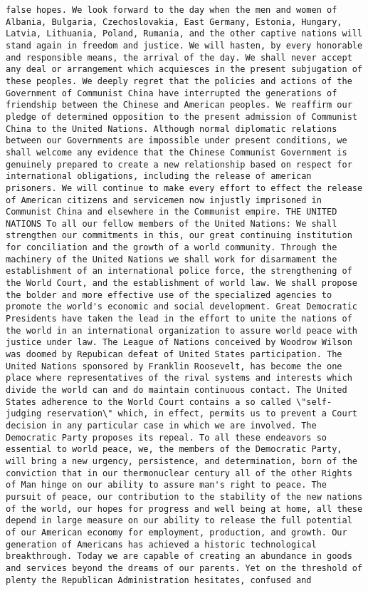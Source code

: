 \documentclass[
]{article}
\begin{document}
\begin{verbatim}
false hopes. We look forward to the day when the men and women of Albania, Bulgaria, Czechoslovakia, East Germany, Estonia, Hungary, Latvia, Lithuania, Poland, Rumania, and the other captive nations will stand again in freedom and justice. We will hasten, by every honorable and responsible means, the arrival of the day. We shall never accept any deal or arrangement which acquiesces in the present subjugation of these peoples. We deeply regret that the policies and actions of the Government of Communist China have interrupted the generations of friendship between the Chinese and American peoples. We reaffirm our pledge of determined opposition to the present admission of Communist China to the United Nations. Although normal diplomatic relations between our Governments are impossible under present conditions, we shall welcome any evidence that the Chinese Communist Government is genuinely prepared to create a new relationship based on respect for international obligations, including the release of american prisoners. We will continue to make every effort to effect the release of American citizens and servicemen now injustly imprisoned in Communist China and elsewhere in the Communist empire. THE UNITED NATIONS To all our fellow members of the United Nations: We shall strengthen our commitments in this, our great continuing institution for conciliation and the growth of a world community. Through the machinery of the United Nations we shall work for disarmament the establishment of an international police force, the strengthening of the World Court, and the establishment of world law. We shall propose the bolder and more effective use of the specialized agencies to promote the world's economic and social development. Great Democratic Presidents have taken the lead in the effort to unite the nations of the world in an international organization to assure world peace with justice under law. The League of Nations conceived by Woodrow Wilson was doomed by Repubican defeat of United States participation. The United Nations sponsored by Franklin Roosevelt, has become the one place where representatives of the rival systems and interests which divide the world can and do maintain continuous contact. The United States adherence to the World Court contains a so called \"self-judging reservation\" which, in effect, permits us to prevent a Court decision in any particular case in which we are involved. The Democratic Party proposes its repeal. To all these endeavors so essential to world peace, we, the members of the Democratic Party, will bring a new urgency, persistence, and determination, born of the conviction that in our thermonuclear century all of the other Rights of Man hinge on our ability to assure man's right to peace. The pursuit of peace, our contribution to the stability of the new nations of the world, our hopes for progress and well being at home, all these depend in large measure on our ability to release the full potential of our American economy for employment, production, and growth. Our generation of Americans has achieved a historic technological breakthrough. Today we are capable of creating an abundance in goods and services beyond the dreams of our parents. Yet on the threshold of plenty the Republican Administration hesitates, confused and 
\end{verbatim}
\end{document}
